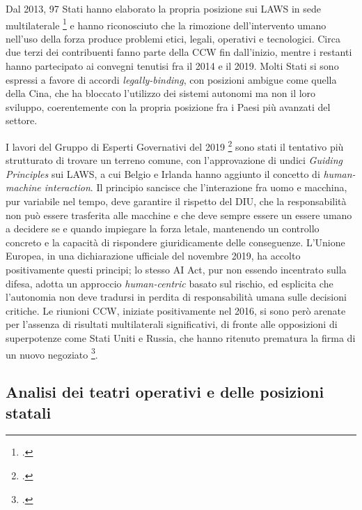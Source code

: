 \documentclass[a4paper,12pt]{report}
\begin{document}
Dal 2013, 97 Stati hanno elaborato la propria posizione sui LAWS in sede
multilaterale \footcite{wareham_2020} e hanno riconosciuto che la rimozione
dell'intervento umano nell'uso della forza produce problemi etici, legali,
operativi e tecnologici. Circa due terzi dei contribuenti fanno parte della CCW
fin dall'inizio, mentre i restanti hanno partecipato ai convegni tenutisi fra il
2014 e il 2019. Molti Stati si sono espressi a favore di accordi
\textit{legally-binding}, con posizioni ambigue come quella della Cina, che ha
bloccato l'utilizzo dei sistemi autonomi ma non il loro sviluppo, coerentemente
con la propria posizione fra i Paesi più avanzati del settore.
 
I lavori del Gruppo di Esperti Governativi del 2019 \footcite{ccw_2019} sono
stati il tentativo più strutturato di trovare un terreno comune, con
l'approvazione di undici \textit{Guiding Principles} sui LAWS, a cui Belgio e
Irlanda hanno aggiunto il concetto di \textit{human-machine interaction}. Il
principio sancisce che l'interazione fra uomo e macchina, pur variabile nel
tempo, deve garantire il rispetto del DIU, che la responsabilità non può essere
trasferita alle macchine e che deve sempre essere un essere umano a decidere se
e quando impiegare la forza letale, mantenendo un controllo concreto e la
capacità di rispondere giuridicamente delle conseguenze. L'Unione Europea, in
una dichiarazione ufficiale del novembre 2019, ha accolto positivamente questi
principi; lo stesso AI Act, pur non essendo incentrato sulla difesa, adotta un
approccio \textit{human-centric} basato sul rischio, ed esplicita che
l'autonomia non deve tradursi in perdita di responsabilità umana sulle decisioni
critiche. Le riunioni CCW, iniziate positivamente nel 2016, si sono però arenate
per l'assenza di risultati multilaterali significativi, di fronte alle
opposizioni di superpotenze come Stati Uniti e Russia, che hanno ritenuto
prematura la firma di un nuovo negoziato \footcite{ant_pen_escalation}.
 
\subsection{Analisi dei teatri operativi e delle posizioni statali}
 
\end{document}
